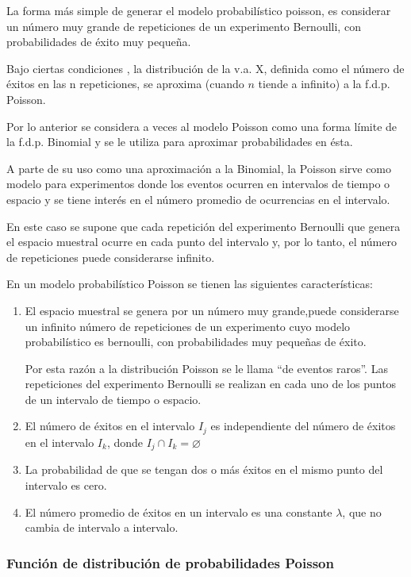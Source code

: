 La forma más simple de generar el
modelo probabilístico poisson, es
considerar un número muy grande de
repeticiones de un experimento
Bernoulli, con probabilidades de éxito
muy pequeña.

Bajo ciertas condiciones , la distribución
de la v.a. X, definida como el número de
éxitos en las n repeticiones, se aproxima
(cuando $n$ tiende a infinito) a la f.d.p.
Poisson.


Por lo anterior se considera a veces al modelo Poisson
como una forma límite de la f.d.p. Binomial y se le utiliza para aproximar probabilidades en ésta.

A parte de su uso como una aproximación a la
Binomial, la Poisson sirve como modelo para
experimentos donde los eventos ocurren en
intervalos de tiempo o espacio y se tiene interés en el número promedio de ocurrencias en el intervalo.

En este caso se supone que cada repetición del experimento Bernoulli que genera el espacio muestral ocurre en cada punto del intervalo y, por lo tanto, el número de repeticiones puede considerarse infinito.

En un modelo probabilístico Poisson se
tienen las siguientes características:

\begin{enumerate}
    \item El espacio muestral se genera por un número muy grande,puede considerarse un infinito número de repeticiones de un experimento cuyo modelo probabilístico es bernoulli, con probabilidades muy pequeñas de éxito.

          Por esta razón a la distribución Poisson se le llama ``de eventos raros''. Las repeticiones del experimento Bernoulli se realizan en cada uno de los puntos de un intervalo de tiempo o espacio.

    \item El número de éxitos en el intervalo
          $I_j$ es independiente del número de éxitos en el intervalo $I_k$, donde $I_j \cap I_k=\varnothing$

    \item La probabilidad de que se tengan
          dos o más éxitos en el mismo punto
          del intervalo es cero.
    \item El número promedio de éxitos en
          un intervalo es una constante $\lambda$, que
          no cambia de intervalo a intervalo.
\end{enumerate}

\subsubsection{Función de distribución de
    probabilidades Poisson}

